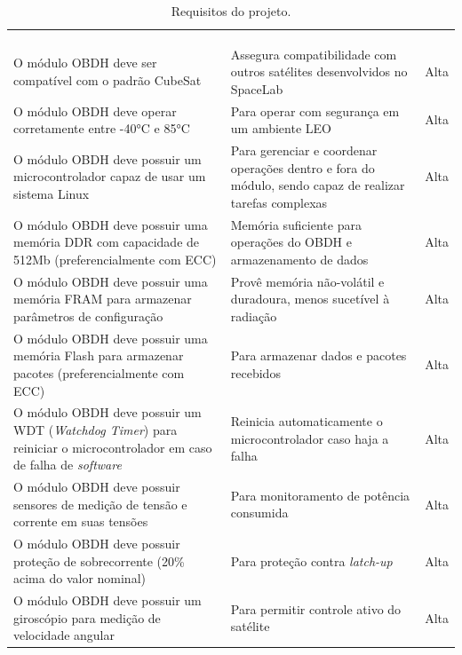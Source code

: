 \begin{longtable}{@{}p{5cm}p{5cm}p{3.5cm}@{}}
    \centering
	\ABNTEXfontereduzida
	\label{tab:Tab_Req}\tabularnewline
	\caption{Requisitos do projeto.}\tabularnewline
	\hline
	\textbf{\centering{Descrição}} & \textbf{\centering{Pretexto}} & \textbf{\centering{Prioridade}} \tabularnewline
        \hline
        O módulo OBDH deve ser compatível com o padrão CubeSat & Assegura compatibilidade com outros satélites desenvolvidos no SpaceLab & Alta \tabularnewline
        
       \hline
        O módulo OBDH deve operar corretamente entre -40°C e 85°C & Para operar com segurança em um ambiente LEO & Alta \tabularnewline

       \hline
        O módulo OBDH deve possuir um microcontrolador capaz de usar um sistema Linux & Para gerenciar e coordenar operações dentro e fora do módulo, sendo capaz de realizar tarefas complexas  & Alta \tabularnewline

       \hline
        O módulo OBDH deve possuir uma memória DDR com capacidade de 512Mb (preferencialmente com ECC)  & Memória suficiente para operações do OBDH e armazenamento de dados  & Alta\tabularnewline

        \hline
        O módulo OBDH deve possuir uma memória FRAM para armazenar parâmetros de configuração & Provê memória não-volátil e duradoura, menos sucetível à radiação & Alta \tabularnewline 

        \hline
        O módulo OBDH deve possuir uma memória Flash para armazenar pacotes (preferencialmente com ECC) & Para armazenar dados e pacotes recebidos & Alta\tabularnewline 

        \hline
        O módulo OBDH deve possuir um WDT (\textit{Watchdog Timer}) para reiniciar o microcontrolador em caso de falha de \textit{software} & Reinicia automaticamente o microcontrolador caso haja a falha  & Alta \tabularnewline

        \hline
        O módulo OBDH deve possuir sensores de medição de tensão e corrente em suas tensões & Para monitoramento de potência consumida & Alta\tabularnewline

        \hline
        O módulo OBDH deve possuir proteção de sobrecorrente (20\% acima do valor nominal) & Para proteção contra \textit{latch-up}  & Alta \tabularnewline

        \hline
        O módulo OBDH deve possuir um giroscópio para medição de velocidade angular & Para permitir controle ativo do satélite  & Alta \tabularnewline 


\end{longtable}
